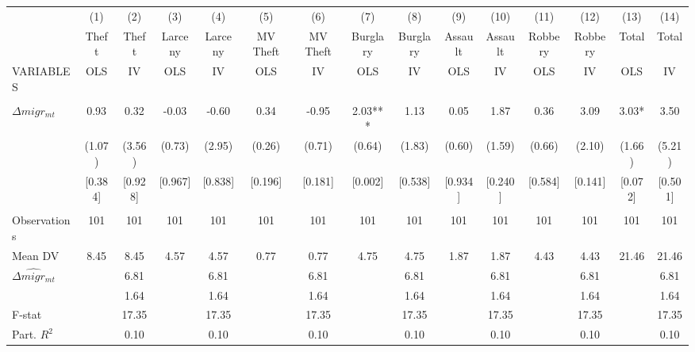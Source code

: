 \begin{tabular}{lcccccccccccccc} \hline
 & (1) & (2) & (3) & (4) & (5) & (6) & (7) & (8) & (9) & (10) & (11) & (12) & (13) & (14) \\
 & Theft & Theft & Larceny & Larceny & MV Theft & MV Theft & Burglary & Burglary & Assault & Assault & Robbery & Robbery & Total & Total \\
VARIABLES & OLS & IV & OLS & IV & OLS & IV & OLS & IV & OLS & IV & OLS & IV & OLS & IV \\ \hline
 &  &  &  &  &  &  &  &  &  &  &  &  &  &  \\
$\Delta migr_{mt}$ & 0.93 & 0.32 & -0.03 & -0.60 & 0.34 & -0.95 & 2.03*** & 1.13 & 0.05 & 1.87 & 0.36 & 3.09 & 3.03* & 3.50 \\
 & (1.07) & (3.56) & (0.73) & (2.95) & (0.26) & (0.71) & (0.64) & (1.83) & (0.60) & (1.59) & (0.66) & (2.10) & (1.66) & (5.21) \\
 & [0.384] & [0.928] & [0.967] & [0.838] & [0.196] & [0.181] & [0.002] & [0.538] & [0.934] & [0.240] & [0.584] & [0.141] & [0.072] & [0.501] \\
 &  &  &  &  &  &  &  &  &  &  &  &  &  &  \\
Observations & 101 & 101 & 101 & 101 & 101 & 101 & 101 & 101 & 101 & 101 & 101 & 101 & 101 & 101 \\
Mean DV & 8.45 & 8.45 & 4.57 & 4.57 & 0.77 & 0.77 & 4.75 & 4.75 & 1.87 & 1.87 & 4.43 & 4.43 & 21.46 & 21.46 \\
$ \widehat{\Delta migr_{mt}} $ &  & 6.81 &  & 6.81 &  & 6.81 &  & 6.81 &  & 6.81 &  & 6.81 &  & 6.81 \\
\hspace{1cm} &  & 1.64 &  & 1.64 &  & 1.64 &  & 1.64 &  & 1.64 &  & 1.64 &  & 1.64 \\
F-stat &  & 17.35 &  & 17.35 &  & 17.35 &  & 17.35 &  & 17.35 &  & 17.35 &  & 17.35 \\
 Part. $ R^2 $ &  & 0.10 &  & 0.10 &  & 0.10 &  & 0.10 &  & 0.10 &  & 0.10 &  & 0.10 \\ \hline
\end{tabular}
